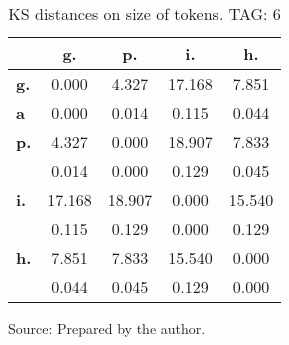 \begin{table}[h!]
\begin{center}
\caption{KS distances on size of tokens. TAG: 6}
	\label{tab:kolTok}
\begin{tabular}{| l || c | c | c | c |}\hline
 & {\bf g.} & {\bf p.} & {\bf i.} & {\bf h.} \\\hline\hline
{\bf g.} & 0.000 & 4.327 & 17.168 & 7.851 \\
{\bf a } & 0.000 & 0.014 & 0.115 & 0.044 \\\hline
{\bf p.} & 4.327 & 0.000 & 18.907 & 7.833 \\
{\bf } & 0.014 & 0.000 & 0.129 & 0.045 \\\hline
{\bf i.} & 17.168 & 18.907 & 0.000 & 15.540 \\
{\bf } & 0.115 & 0.129 & 0.000 & 0.129 \\\hline
{\bf h.} & 7.851 & 7.833 & 15.540 & 0.000 \\
{\bf } & 0.044 & 0.045 & 0.129 & 0.000 \\\hline
\end{tabular}
\begin{flushleft}
		Source: Prepared by the author.\
\end{flushleft}
\end{center}
\end{table}
